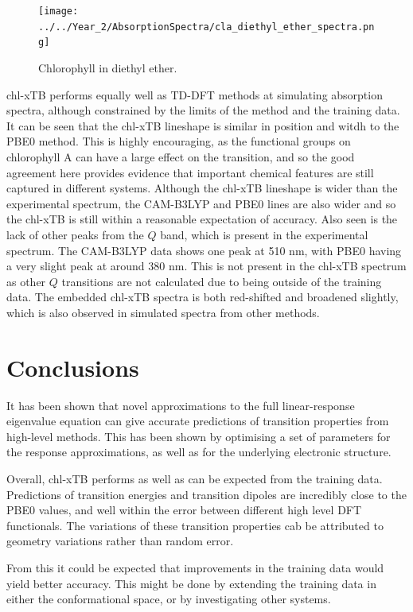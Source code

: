 \begin{figure}
    \centering
    \texttt{[image: ../../Year\_2/AbsorptionSpectra/cla\_diethyl\_ether\_spectra.png]}
    \caption{Chlorophyll in diethyl ether.}
    \label{fig:chl_diethyl_ether}
\end{figure}

chl-xTB performs equally well as TD-DFT methods at simulating absorption spectra,
although constrained by the limits of the method and the training data.
It can be seen that the chl-xTB lineshape is similar in position and witdh to the
PBE0 method. This is highly encouraging, as the functional groups on chlorophyll A
can have a large effect on the \Qy transition, and so the good agreement here provides
evidence that important chemical features are still captured in different systems.
Although the chl-xTB lineshape is wider than the experimental spectrum, the CAM-B3LYP 
and PBE0 lines are also wider and so the chl-xTB is still within a reasonable expectation 
of accuracy.
Also seen is the lack of other peaks from the $Q$ band, which is present in the
experimental spectrum. The CAM-B3LYP data shows one peak at 510 nm, with PBE0 having
a very slight peak at around 380 nm. This is not present in the chl-xTB spectrum
as other $Q$ transitions are not calculated due to being outside of the training
data. The embedded chl-xTB spectra is both red-shifted and broadened slightly, which
is also observed in simulated spectra from other methods.

\section{Conclusions}
\label{sec:chl_conclusions}

It has been shown that novel approximations to the full linear-response eigenvalue
equation can give accurate predictions of transition properties from high-level methods.
This has been shown by optimising a set of parameters for the response approximations,
as well as for the underlying electronic structure.

Overall, chl-xTB performs as well as can be expected from the training data. Predictions
of transition energies and transition dipoles are incredibly close to the PBE0
values, and well within the error between different high level DFT functionals. 
The variations of these transition properties cab be attributed to geometry variations
rather than random error. 


From this it could be expected that improvements in the training data would yield 
better accuracy. This might be done by extending the training data in either the 
conformational space, or by investigating other systems. 

